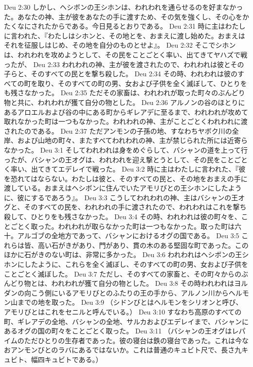 Deu 2:30  しかし、ヘシボンの王シホンは、われわれを通らせるのを好まなかった。あなたの神、主が彼をあなたの手に渡すため、その気を強くし、その心をかたくなにされたからである。今日見るとおりである。
Deu 2:31  時に主はわたしに言われた、『わたしはシホンと、その地とを、おまえに渡し始めた。おまえはそれを征服しはじめ、その地を自分のものとせよ』。
Deu 2:32  そこでシホンは、われわれを攻めようとして、その民をことごとく率い、出てきてヤハズで戦ったが、
Deu 2:33  われわれの神、主が彼を渡されたので、われわれは彼とその子らと、そのすべての民とを撃ち殺した。
Deu 2:34  その時、われわれは彼のすべての町を取り、そのすべての町の男、女および子供を全く滅ぼして、ひとりをも残さなかった。
Deu 2:35  ただその家畜は、われわれが取った町々のぶんどり物と共に、われわれが獲て自分の物とした。
Deu 2:36  アルノンの谷のほとりにあるアロエルおよび谷の中にある町からギレアデに至るまで、われわれが攻めて取れなかった町は一つもなかった。われわれの神、主がことごとくわれわれに渡されたのである。
Deu 2:37  ただアンモンの子孫の地、すなわちヤボク川の全岸、および山地の町々、またすべてわれわれの神、主が禁じられた所には近寄らなかった。
Deu 3:1  そしてわれわれは身をめぐらして、バシャンの道を上って行ったが、バシャンの王オグは、われわれを迎え撃とうとして、その民をことごとく率い、出てきてエデレイで戦った。
Deu 3:2  時に主はわたしに言われた、『彼を恐れてはならない。わたしは彼と、そのすべての民と、その地をおまえの手に渡している。おまえはヘシボンに住んでいたアモリびとの王シホンにしたように、彼にするであろう』。
Deu 3:3  こうしてわれわれの神、主はバシャンの王オグと、そのすべての民を、われわれの手に渡されたので、われわれはこれを撃ち殺して、ひとりをも残さなかった。
Deu 3:4  その時、われわれは彼の町々を、ことごとく取った。われわれが取らなかった町は一つもなかった。取った町は六十。アルゴブの全地方であって、バシャンにおけるオグの国である。
Deu 3:5  これらは皆、高い石がきがあり、門があり、貫の木のある堅固な町であった。このほかに石がきのない町は、非常に多かった。
Deu 3:6  われわれはヘシボンの王シホンにしたように、これらを全く滅ぼし、そのすべての町の男、女および子供をことごとく滅ぼした。
Deu 3:7  ただし、そのすべての家畜と、その町々からのぶんどり物とは、われわれが獲て自分の物とした。
Deu 3:8  その時われわれはヨルダンの向こう側にいるアモリびとのふたりの王の手から、アルノン川からヘルモン山までの地を取った。
Deu 3:9  （シドンびとはヘルモンをシリオンと呼び、アモリびとはこれをセニルと呼んでいる。）
Deu 3:10  すなわち高原のすべての町、ギレアデの全地、バシャンの全地、サルカおよびエデレイまで、バシャンにあるオグの国の町々をことごとく取った。
Deu 3:11  （バシャンの王オグはレパイムのただひとりの生存者であった。彼の寝台は鉄の寝台であった。これは今なおアンモンびとのラバにあるではないか。これは普通のキュビト尺で、長さ九キュビト、幅四キュビトである。）
